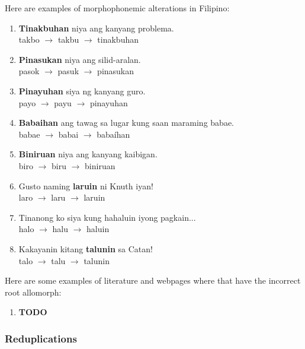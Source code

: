 \begin{example}
    Here are examples of morphophonemic alterations in Filipino:
\end{example}
\begin{enumerate}
    \item \textbf{Tinakbuhan} niya ang kanyang problema. \\
          takbo \(\rightarrow\) takbu \(\rightarrow\) tinakbuhan
    \item \textbf{Pinasukan} niya ang silid-aralan. \\
          pasok \(\rightarrow\) pasuk \(\rightarrow\) pinasukan
    \item \textbf{Pinayuhan} siya ng kanyang guro. \\
          payo \(\rightarrow\) payu \(\rightarrow\) pinayuhan
    \item \textbf{Babaihan} ang tawag sa lugar kung saan maraming babae. \\
          babae \(\rightarrow\) babai \(\rightarrow\) babaíhan
    \item \textbf{Biniruan} niya ang kanyang kaibigan. \\
          biro \(\rightarrow\) biru \(\rightarrow\) biniruan
    \item Gusto naming \textbf{laruin} ni Knuth iyan! \\
          laro  \(\rightarrow\) laru \(\rightarrow\) laruin
    \item Tinanong ko siya kung hahaluin iyong pagkain... \\
          halo  \(\rightarrow\) halu \(\rightarrow\) haluin
    \item Kakayanin kitang \textbf{talunin} sa Catan! \\
          talo  \(\rightarrow\) talu  \(\rightarrow\) talunin
\end{enumerate}


\begin{example}
    Here are some examples of literature and webpages where that have the incorrect
    root allomorph:
\end{example}
\begin{enumerate}
    \item \textbf{TODO}
\end{enumerate}

\subsubsection{Reduplications}

